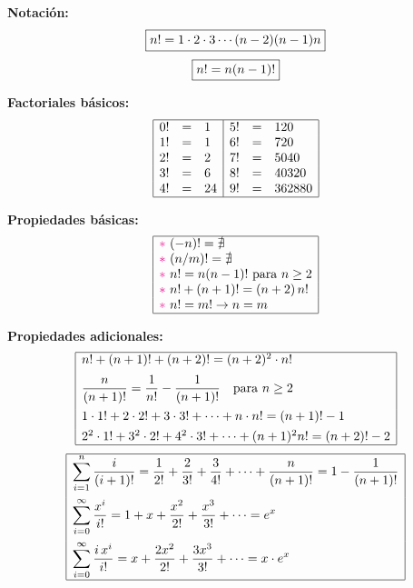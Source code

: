 \documentclass[11pt,a4paper]{article}
\begin{document}
\begin{minipage}[t]{0.436\textwidth}
\textbf{Notación:}
\[\fbox{$n! = 1\cdot2\cdot3\cdots(n-2)(n-1)n$}\]
\[\fbox{$n! = n(n-1)!$}\]

\textbf{Factoriales básicos:}
\[
\begin{array}{|rcl|rcl|}
\hline
0! &=& 1  & 5! &=& 120\\
1! &=& 1  & 6! &=& 720\\
2! &=& 2  & 7! &=& 5040\\
3! &=& 6  & 8! &=& 40320\\
4! &=& 24 & 9! &=& 362880\\ \hline
\end{array}
\]

\textbf{Propiedades básicas:}
\[
\begin{array}{|l|}
\hline
\textcolor{magenta}{\ast}\ (-n)! = \nexists\\
\textcolor{magenta}{\ast}\ (n/m)! = \nexists\\
\textcolor{magenta}{\ast}\ n! = n(n-1)! \text{ para } n \geq 2\\
\textcolor{magenta}{\ast}\ n! + (n+1)! = (n+2)\,n!\\
\textcolor{magenta}{\ast}\ n! = m! \rightarrow n = m\\ \hline
\end{array}
\]
\end{minipage}\hfill
\begin{minipage}[t]{0.533\textwidth}\small
\textbf{Propiedades adicionales:}
\[
\begin{array}{|l|}
\hline
n! + (n+1)! + (n+2)! = (n+2)^2\cdot n!\\[6pt]
\dfrac{n}{(n+1)!} = \dfrac{1}{n!} - \dfrac{1}{(n+1)!} \quad \text{para } n \geq 2\\[10pt]
1\cdot1! + 2\cdot2! + 3\cdot3! + \cdots + n\cdot n! = (n+1)! - 1\\[4pt]
2^2\cdot1! + 3^2\cdot2! + 4^2\cdot3! + \cdots + (n+1)^2 n! = (n+2)! - 2\\ \hline
\end{array}
\]
\[
\begin{array}{|l|}
\hline
\displaystyle\sum_{i=1}^{n}\frac{i}{(i+1)!} = \frac{1}{2!} + \frac{2}{3!} + \frac{3}{4!} + \cdots + \frac{n}{(n+1)!} = 1 - \frac{1}{(n+1)!}\\[14pt]
\displaystyle\sum_{i=0}^{\infty}\frac{x^i}{i!} = 1 + x + \frac{x^2}{2!} + \frac{x^3}{3!} + \cdots = e^x\\[14pt]
\displaystyle\sum_{i=0}^{\infty}\frac{i\,x^i}{i!} = x + \frac{2x^2}{2!} + \frac{3x^3}{3!} + \cdots = x\cdot e^x\\[10pt] \hline
\end{array}
\]
\end{minipage}
\end{document}
